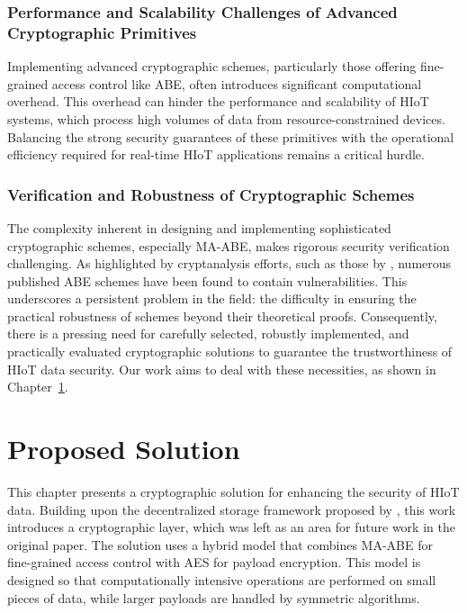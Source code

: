 \documentclass[cic,tc,english]{iiufrgs}
\numberwithin{algorithm}{chapter}
\begin{document}
        \subsection{Performance and Scalability Challenges of Advanced Cryptographic Primitives}
            Implementing advanced cryptographic schemes, particularly those offering fine-grained access control like ABE, often introduces significant computational overhead. This overhead can hinder the performance and scalability of HIoT systems, which process high volumes of data from resource-constrained devices. Balancing the strong security guarantees of these primitives with the operational efficiency required for real-time HIoT applications remains a critical hurdle.

        \subsection{Verification and Robustness of Cryptographic Schemes}
            The complexity inherent in designing and implementing sophisticated cryptographic schemes, especially MA-ABE, makes rigorous security verification challenging. As highlighted by cryptanalysis efforts, such as those by \citet{broken2020}, numerous published ABE schemes have been found to contain vulnerabilities. This underscores a persistent problem in the field: the difficulty in ensuring the practical robustness of schemes beyond their theoretical proofs. Consequently, there is a pressing need for carefully selected, robustly implemented, and practically evaluated cryptographic solutions to guarantee the trustworthiness of HIoT data security. Our work aims to deal with these necessities, as shown in Chapter~\ref{chap:proposedsolution}.

\chapter{Proposed Solution}
    \label{chap:proposedsolution}

    This chapter presents a cryptographic solution for enhancing the security of HIoT data. Building upon the decentralized storage framework proposed by \citet{laura2023}, this work introduces a cryptographic layer, which was left as an area for future work in the original paper. The solution uses a hybrid model that combines MA-ABE for fine-grained access control with AES for payload encryption. This model is designed so that computationally intensive operations are performed on small pieces of data, while larger payloads are handled by symmetric algorithms.
\end{document}
